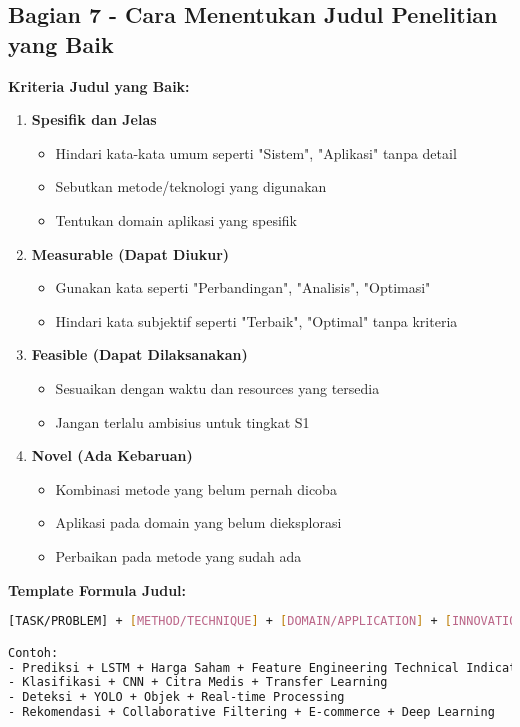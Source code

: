 \subsection*{Bagian 7 - Cara Menentukan Judul Penelitian yang Baik}

\textbf{Kriteria Judul yang Baik:}

\begin{enumerate}
    \item \textbf{Spesifik dan Jelas}
    \begin{itemize}
        \item Hindari kata-kata umum seperti "Sistem", "Aplikasi" tanpa detail
        \item Sebutkan metode/teknologi yang digunakan
        \item Tentukan domain aplikasi yang spesifik
    \end{itemize}

    \item \textbf{Measurable (Dapat Diukur)}
    \begin{itemize}
        \item Gunakan kata seperti "Perbandingan", "Analisis", "Optimasi"
        \item Hindari kata subjektif seperti "Terbaik", "Optimal" tanpa kriteria
    \end{itemize}

    \item \textbf{Feasible (Dapat Dilaksanakan)}
    \begin{itemize}
        \item Sesuaikan dengan waktu dan resources yang tersedia
        \item Jangan terlalu ambisius untuk tingkat S1
    \end{itemize}

    \item \textbf{Novel (Ada Kebaruan)}
    \begin{itemize}
        \item Kombinasi metode yang belum pernah dicoba
        \item Aplikasi pada domain yang belum dieksplorasi
        \item Perbaikan pada metode yang sudah ada
    \end{itemize}
\end{enumerate}

\textbf{Template Formula Judul:}
\begin{lstlisting}[language=bash, style=bash, caption=Formula Judul Penelitian]
[TASK/PROBLEM] + [METHOD/TECHNIQUE] + [DOMAIN/APPLICATION] + [INNOVATION]

Contoh:
- Prediksi + LSTM + Harga Saham + Feature Engineering Technical Indicators
- Klasifikasi + CNN + Citra Medis + Transfer Learning
- Deteksi + YOLO + Objek + Real-time Processing
- Rekomendasi + Collaborative Filtering + E-commerce + Deep Learning
\end{lstlisting}


